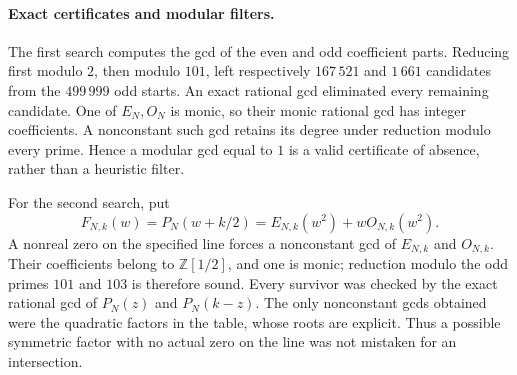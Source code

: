 \documentclass[11pt,a4paper]{article}
\theoremstyle{definition}
\theoremstyle{remark}
\numberwithin{equation}{section}
\begin{document}
\paragraph{Exact certificates and modular filters.}
The first search computes the gcd of the even and odd coefficient parts.
Reducing first modulo $2$, then modulo $101$, left respectively
$167\,521$ and $1\,661$ candidates from the $499\,999$ odd starts.
An exact rational gcd eliminated every remaining candidate.
One of $E_N,O_N$ is monic, so their monic rational gcd has integer
coefficients. A nonconstant such gcd retains its degree under reduction
modulo every prime. Hence a modular gcd equal to $1$ is a valid
certificate of absence, rather than a heuristic filter.

For the second search, put
\[
 F_{N,k}(w)=P_N(w+k/2)
          =E_{N,k}(w^2)+wO_{N,k}(w^2).
\]
A nonreal zero on the specified line forces a nonconstant gcd of
$E_{N,k}$ and $O_{N,k}$. Their coefficients belong to
$\mathbb Z[1/2]$, and one is monic; reduction modulo the odd primes
$101$ and $103$ is therefore sound. Every survivor was checked by the
exact rational gcd of $P_N(z)$ and $P_N(k-z)$. The only nonconstant
gcds obtained were the quadratic factors in the table, whose roots are
explicit. Thus a possible symmetric factor with no actual zero on the
line was not mistaken for an intersection.
\end{document}
